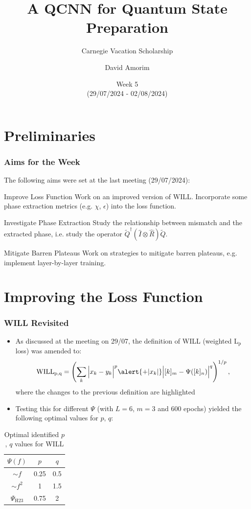 \documentclass{beamer}
\title[QCNN State Preparation]{A QCNN for Quantum State Preparation}
\subtitle{Carnegie Vacation Scholarship}
\author[David Amorim]{David Amorim}
\institute[]{}
\date[05/08/2024]{Week 5 \\(29/07/2024 - 02/08/2024)}
\begin{document}
\frame{\titlepage}

\section{Preliminaries}
\begin{frame}
\frametitle{Aims for the Week}
The following aims were set at the last meeting (29/07/2024):

\begin{alertblock}{Improve Loss Function}
Work on an improved version of WILL. Incorporate some phase extraction metrics (e.g. $\chi$, $\epsilon$) into the loss function. 
\end{alertblock}

\begin{alertblock}{Investigate Phase Extraction}
Study the relationship between mismatch and the extracted phase, i.e. study the operator $\tilde{Q}^\dagger (\hat{I} \otimes\hat{R}) \tilde{Q}$. 
\end{alertblock}

\begin{alertblock}{Mitigate Barren Plateaus}
Work on strategies to mitigate barren plateaus, e.g. implement layer-by-layer training.
\end{alertblock}
\end{frame}

\section{Improving the Loss Function}

\begin{frame}
\frametitle{WILL Revisited}
\begin{itemize}
\item As discussed at the meeting on 29/07, the definition of \alert{WILL} (weighted L$_\text{p}$ loss) was amended to: 
\begin{equation}
\text{WILL}_\text{p,q} =  \left( \sum_k \Big|x_k -y_k \Big|^p \alert{+ |x_k|} \Big|[k]_m - \Psi([k]_n) \Big|^q \right)^{1/p},
\end{equation}
where the changes to the previous definition are highlighted
\item Testing this for different $\Psi$ (with $L=6$, $m=3$ and 600 epochs) yielded the following optimal values for $p$, $q$:
\end{itemize}
\begin{table}
\centering 
\begin{tabular}{c|c| c}
$\Psi(f)$ & $p$ & $q$ \\ \hline 
$\sim f$ & 0.25 & 0.5  \\
$\sim  f^2$ & 1 & 1.5  \\
$\Psi_{\text{H23}}$ & 0.75 & 2  \\
\end{tabular}
\caption{Optimal identified $p$, $q$ values for WILL}
\end{table}
\end{frame}
\end{document}
